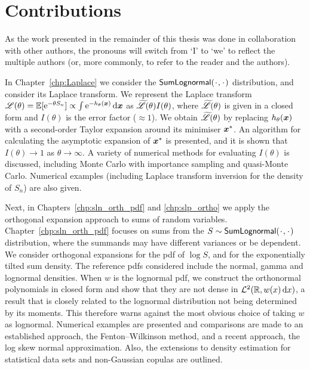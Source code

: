 \section{Contributions}

As the work presented in the remainder of this thesis was done in collaboration with other authors, the pronouns will switch from `I' to `we' to reflect the multiple authors (or, more commonly, to refer to the reader and the authors).

In Chapter~\ref{chp:Laplace} we consider the $\SLNDist(\argdot,\argdot)$ distribution, and consider its Laplace transform. We represent the Laplace transform ${\mathscr{L}}(\theta)=\operatorname{{\mathbb E}}[\mathrm{e}^{-\theta S_n}]\propto \int \mathrm{e}^{ {-}h_\theta(\bm{x}) } \mathop{}\!\mathrm{d} \bm{x}$ as $\widetilde{\mathscr{L}}(\theta)I(\theta)$, where $\widetilde{\mathscr{L}}(\theta)$ is given in a closed form and $I(\theta)$ is the error factor ($\approx 1$). We obtain $\widetilde{\mathscr{L}}(\theta)$ by replacing $h_\theta(\bm{x})$ with a second-order Taylor expansion around its minimiser $\bm{x}^*$. An algorithm for calculating the asymptotic expansion of $\bm{x}^*$ is presented, and it is shown that $I(\theta)\to 1$ as $\theta\to\infty$. A variety of numerical methods for evaluating $I(\theta)$ is discussed, including Monte Carlo with importance sampling and quasi-Monte Carlo. Numerical examples (including Laplace transform inversion for the density of $S_n$) are also given.

Next, in Chapters~\ref{chp:sln_orth_pdf} and \ref{chp:slp_ortho} we apply the orthogonal expansion approach to sums of random variables. Chapter~\ref{chp:sln_orth_pdf} focuses on sums from the $S \sim \SLNDist(\argdot,\argdot)$ distribution, where the summands may have different
variances or be dependent. We consider orthogonal expansions for the pdf of $\log S$, and for the exponentially tilted sum density. The reference pdfs considered include the normal, gamma and lognormal densities. When $w$ is the lognormal pdf, we construct the orthonormal polynomials in closed form and show that they are not dense in $\mathcal{L}^2(\mathbb{R}, w(x) \mathop{}\!\mathrm{d} x)$, a result that is closely related to the lognormal distribution not being determined by its moments. This therefore warns against the most obvious choice of taking $w$ as lognormal. Numerical examples are presented and comparisons are made to an established approach, the Fenton--Wilkinson method, and a recent approach, the log skew normal approximation. Also, the extensions to density estimation for statistical data sets and non-Gaussian copulas are outlined.

